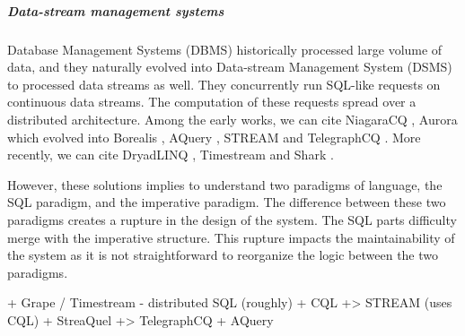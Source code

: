 

\subparagraph{Data-stream management systems}


Database Management Systems (DBMS) historically processed large volume of data, and they naturally evolved into Data-stream Management System (DSMS) to processed data streams as well.
They concurrently run SQL-like requests on continuous data streams.
The computation of these requests spread over a distributed architecture.
Among the early works, we can cite NiagaraCQ \cite{Chen2000,Naughton2001}, Aurora \cite{Abadi2003,Abadi2003a,Balakrishnan2004} which evolved into Borealis \cite{Abadi2005}, AQuery \cite{Lerner2003}, STREAM \cite{Arasu2003,Arasu2005} and TelegraphCQ \cite{Krishnamurthy2003,Chandrasekaran2003}.
More recently, we can cite DryadLINQ \cite{Isard2007,Yu2009}, Timestream \cite{Qian2013} and Shark \cite{Xin2013}.

However, these solutions implies to understand two paradigms of language, the SQL paradigm, and the imperative paradigm.
The difference between these two paradigms creates a rupture in the design of the system.
The SQL parts difficulty merge with the imperative structure.
This rupture impacts the maintainability of the system as it is not straightforward to reorganize the logic between the two paradigms.


  + Grape / Timestream - distributed SQL (roughly)
  + CQL
  +> STREAM (uses CQL)
  + StreaQuel
  +> TelegraphCQ
  + AQuery




